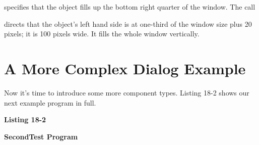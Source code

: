 
\noindent
specifies that the object fills up the bottom right quarter of the
window. The call


\noindent
directs that the object's left hand side is at
one-third of the window size plus 20 pixels; it is 100 pixels wide. It
fills the whole window vertically.

\section{A More Complex Dialog Example}

Now it's time to introduce some more component types.
Listing 18-2 shows our next example program in full.

\bigskip

{\sffamily\bfseries
Listing 18-2}

{\sffamily\bfseries
SecondTest Program}

